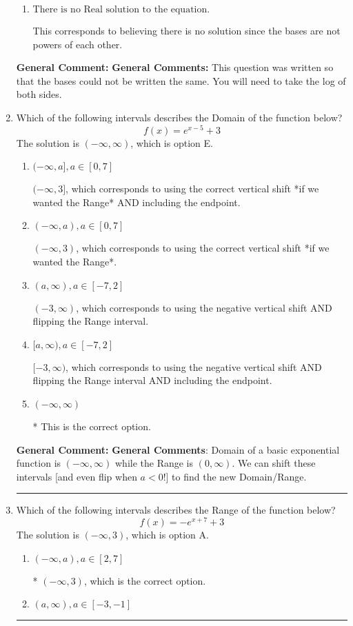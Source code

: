 \documentclass{extbook}[14pt]
\newcommand{\litem}[1]{\item #1

\rule{\textwidth}{0.4pt}}
\begin{document}
\begin{enumerate}
{\begin{enumerate}[label=\Alph*.]
* $x = 48.585$, which is the correct option.
\item \( \text{There is no Real solution to the equation.} \)

This corresponds to believing there is no solution since the bases are not powers of each other.
\end{enumerate}

\textbf{General Comment:} \textbf{General Comments:} This question was written so that the bases could not be written the same. You will need to take the log of both sides.
}
\litem{
Which of the following intervals describes the Domain of the function below?
\[ f(x) = e^{x-5}+3 \]
The solution is \( (-\infty, \infty) \), which is option E.\begin{enumerate}[label=\Alph*.]
\item \( (-\infty, a], a \in [0, 7] \)

$(-\infty, 3]$, which corresponds to using the correct vertical shift *if we wanted the Range* AND including the endpoint.
\item \( (-\infty, a), a \in [0, 7] \)

$(-\infty, 3)$, which corresponds to using the correct vertical shift *if we wanted the Range*.
\item \( (a, \infty), a \in [-7, 2] \)

$(-3, \infty)$, which corresponds to using the negative vertical shift AND flipping the Range interval.
\item \( [a, \infty), a \in [-7, 2] \)

$[-3, \infty)$, which corresponds to using the negative vertical shift AND flipping the Range interval AND including the endpoint.
\item \( (-\infty, \infty) \)

* This is the correct option.
\end{enumerate}

\textbf{General Comment:} \textbf{General Comments}: Domain of a basic exponential function is $(-\infty, \infty)$ while the Range is $(0, \infty)$. We can shift these intervals [and even flip when $a<0$!] to find the new Domain/Range.
}
\litem{
Which of the following intervals describes the Range of the function below?
\[ f(x) = -e^{x+7}+3 \]
The solution is \( (-\infty, 3) \), which is option A.\begin{enumerate}[label=\Alph*.]
\item \( (-\infty, a), a \in [2, 7] \)

* $(-\infty, 3)$, which is the correct option.
\item \( (a, \infty), a \in [-3, -1] \)


\end{enumerate}}
\end{enumerate}
\end{document}
